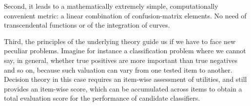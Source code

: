 \documentclass[\ifafour a4paper,12pt,\else a5paper,10pt,\fi%
onecolumn,oneside,article,%
british%
]{memoir}
\makeatletter
\newcommand*{\widefbox}[1]{\fbox{\hspace{1em}#1\hspace{1em}}}
\theoremstyle{remark}
\theoremstyle{innote}
\def\sum{\DOTSI\sumop\slimits@}
\newcommand*{\pencil}{{\fontencoding{U}\fontfamily{fontawesometwo}\selectfont\symbol{210}}}
\newcommand{\mynotep}[1]{{\footnotesize\color{notecolour}\pencil\ #1}}
\newcommand*{\de}{\partialup}%
\newcommand*{\p}{\mathrm{p}}%
\renewcommand*{\|}[1][]{\nonscript\:#1\vert\nonscript\:\mathopen{}}
\newcommand*{\tsum}{\mathop{\textstyle\sum}\nolimits}
\makeatother
\begin{document}
Second, it leads to a mathematically extremely simple, computationally convenient metric: a linear combination of confusion-matrix elements. No need of transcendental functions or of the integration of curves.

Third, the principles of the underlying theory guide us if we have to face new peculiar problems. Imagine for instance a classification problem where we cannot say, in general, whether true positives are more important than true negatives and so on, because such valuation can vary from one tested item to another. Decision theory in this case requires an item-wise assessment of utilities, and still provides an item-wise score, which can be accumulated across items to obtain a total evaluation score for the performance of candidate classifiers.












\end{document}
